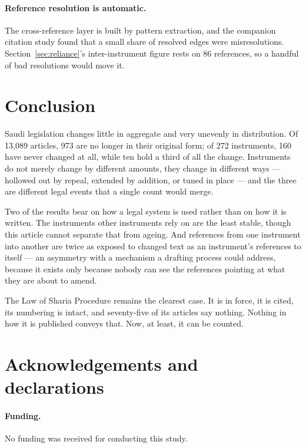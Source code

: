 \documentclass[11pt]{article}
\newif\ifanon
\begin{document}
\paragraph{Reference resolution is automatic.} The cross-reference layer is
built by pattern extraction, and the companion citation study found that a
small share of resolved edges were misresolutions. Section~\ref{sec:reliance}'s
inter-instrument figure rests on 86 references, so a handful of bad
resolutions would move it.

\section{Conclusion}

Saudi legislation changes little in aggregate and very unevenly in
distribution. Of 13,089 articles, 973 are no longer in their original form; of
272 instruments, 160 have never changed at all, while ten hold a third of all
the change. Instruments do not merely change by different amounts, they change
in different ways --- hollowed out by repeal, extended by addition, or tuned in
place --- and the three are different legal events that a single count would
merge.

Two of the results bear on how a legal system is used rather than on how it is
written. The instruments other instruments rely on are the least stable, though
this article cannot separate that from ageing. And references from one
instrument into another are twice as exposed to changed text as an
instrument's references to itself --- an asymmetry with a mechanism a drafting
process could address, because it exists only because nobody can see the
references pointing at what they are about to amend.

The Law of Sharia Procedure remains the clearest case. It is in force, it is
cited, its numbering is intact, and seventy-five of its articles say nothing.
Nothing in how it is published conveys that. Now, at least, it can be counted.

\ifanon\else
\section*{Acknowledgements and declarations}

\paragraph{Funding.} No funding was received for conducting this study.
\end{document}
